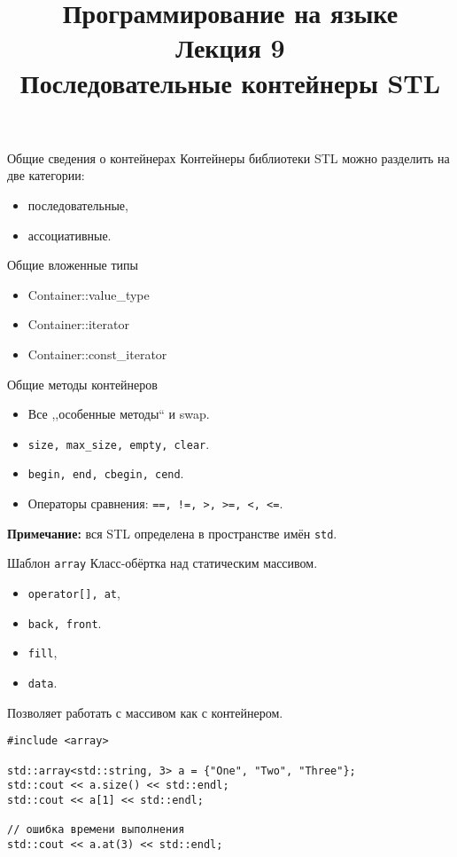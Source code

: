 \documentclass[aspectration=1610,t]{beamer}
\title{{\bf Программирование на языке \langcpp \protect\\Лекция
9\protect\vspace{1em}\\}Последовательные контейнеры STL}
\begin{document}
\begin{frame} 
  \titlepage
\end{frame}

\begin{frame}{Общие сведения о контейнерах}
    Контейнеры библиотеки STL можно разделить на две категории: 
    \begin{itemize}
        \item последовательные, 
        \item ассоциативные.
    \end{itemize}
    \pause
    \begin{block}{Общие вложенные типы}
    \begin{itemize} \tt
        \item Container::value\_type
        \item Container::iterator
        \item Container::const\_iterator 
    \end{itemize}
    \end{block}\pause\vspace{-3mm}
    \begin{block}{Общие методы контейнеров}
    \begin{itemize}
    \item Все ,,особенные методы`` и swap.

    \item \texttt{size, max\_size, empty, clear}.
    
    \item \texttt{begin, end, сbegin, сend}.

    \item Операторы сравнения: \texttt{==, !=, >, >=, <, <=}.
    \end{itemize}
\end{block}\vspace{-2mm}
\textbf{Примечание:} вся STL определена в пространстве имён \texttt{std}.
\end{frame}

\begin{frame}[fragile]{Шаблон {\tt array}}
    Класс-обёртка над статическим массивом.

\begin{itemize}
    \item \texttt{operator[], at},
    \item {\tt back, front}.
    \item \texttt{fill},
    \item \texttt{data}.
\end{itemize}
Позволяет работать с массивом как с контейнером.

\begin{lstlisting}
#include <array>

std::array<std::string, 3> a = {"One", "Two", "Three"};
std::cout << a.size() << std::endl;
std::cout << a[1] << std::endl;

// ошибка времени выполнения
std::cout << a.at(3) << std::endl; 
\end{lstlisting}
\end{frame}
\end{document}
